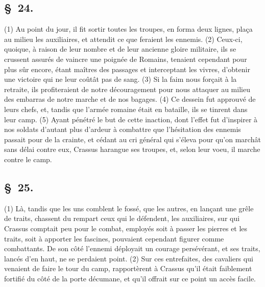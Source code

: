 \documentclass[french,twoside]{book} %
\begin{document}
\subsection[{§ 24.}]{ \textsc{§ 24.} }
\noindent (1) Au point du jour, il fit sortir toutes les troupes, en forma deux lignes, plaça au milieu les auxiliaires, et attendit ce que feraient les ennemis. (2) Ceux-ci, quoique, à raison de leur nombre et de leur ancienne gloire militaire, ils se crussent assurés de vaincre une poignée de Romains, tenaient cependant pour plus sûr encore, étant maîtres des passages et interceptant les vivres, d’obtenir une victoire qui ne leur coûtât pas de sang. (3) Si la faim nous forçait à la retraite, ils profiteraient de notre découragement pour nous attaquer au milieu des embarras de notre marche et de nos bagages. (4) Ce dessein fut approuvé de leurs chefs, et, tandis que l’armée romaine était en bataille, ils se tinrent dans leur camp. (5) Ayant pénétré le but de cette inaction, dont l’effet fut d’inspirer à nos soldats d’autant plus d’ardeur à combattre que l’hésitation des ennemis passait pour de la crainte, et cédant au cri général qui s’éleva pour qu’on marchât sans délai contre eux, Crassus harangue ses troupes, et, selon leur voeu, il marche contre le camp.
\subsection[{§ 25.}]{ \textsc{§ 25.} }
\noindent (1) Là, tandis que les uns comblent le fossé, que les autres, en lançant une grêle de traits, chassent du rempart ceux qui le défendent, les auxiliaires, sur qui Crassus comptait peu pour le combat, employés soit à passer les pierres et les traits, soit à apporter les fascines, pouvaient cependant figurer comme combattants. De son côté l’ennemi déployait un courage persévérant, et ses traits, lancés d’en haut, ne se perdaient point. (2) Sur ces entrefaites, des cavaliers qui venaient de faire le tour du camp, rapportèrent à Crassus qu’il était faiblement fortifié du côté de la porte décumane, et qu’il offrait sur ce point un accès facile.
\end{document}
